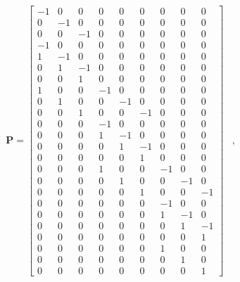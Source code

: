 \[
   \begin{array}{ll}
	
	\mathbf{P} = \left[ \begin{array}{ccccccccc}
	 -1 & 0 & 0 & 0 & 0 & 0 & 0 & 0 & 0 \\
	 0 & -1 & 0 & 0 & 0 & 0 & 0 & 0 & 0 \\	 
	 0 & 0 & -1 & 0 & 0 & 0 & 0 & 0 & 0 \\	 
	 -1 & 0 & 0 & 0 & 0 & 0 & 0 & 0 & 0 \\	 
	 1 & -1 & 0 & 0 & 0 & 0 & 0 & 0 & 0 \\	 
	 0 & 1 & -1 & 0 & 0 & 0 & 0 & 0 & 0 \\	 
	 0 & 0 & 1 & 0 & 0 & 0 & 0 & 0 & 0 \\	 
	 1 & 0 & 0 & -1 & 0 & 0 & 0 & 0 & 0 \\	 
	 0 & 1 & 0 & 0 & -1 & 0 & 0 & 0 & 0 \\	 
	 0 & 0 & 1 & 0 & 0 & -1 & 0 & 0 & 0 \\	 
	 0 & 0 & 0 & -1 & 0 & 0 & 0 & 0 & 0 \\	 
	 0 & 0 & 0 & 1 & -1 & 0 & 0 & 0 & 0 \\	 
	 0 & 0 & 0 & 0 & 1 & -1 & 0 & 0 & 0 \\	 
	 0 & 0 & 0 & 0 & 0 & 1 & 0 & 0 & 0 \\	 
	 0 & 0 & 0 & 1 & 0 & 0 & -1 & 0 & 0 \\	 
	 0 & 0 & 0 & 0 & 1 & 0 & 0 & -1 & 0 \\	 
	 0 & 0 & 0 & 0 & 0 & 1 & 0 & 0 & -1 \\	 
	 0 & 0 & 0 & 0 & 0 & 0 & -1 & 0 & 0 \\	 
	 0 & 0 & 0 & 0 & 0 & 0 & 1 & -1 & 0 \\	 
	 0 & 0 & 0 & 0 & 0 & 0 & 0 & 1 & -1 \\	 
	 0 & 0 & 0 & 0 & 0 & 0 & 0 & 0 & 1 \\	 
	 0 & 0 & 0 & 0 & 0 & 0 & 1 & 0 & 0 \\	 
	 0 & 0 & 0 & 0 & 0 & 0 & 0 & 1 & 0 \\	 
	 0 & 0 & 0 & 0 & 0 & 0 & 0 & 0 & 1	 	 	 	 	 	 	 		\end{array}\right] &, \qquad
	 

\end{array}\]

